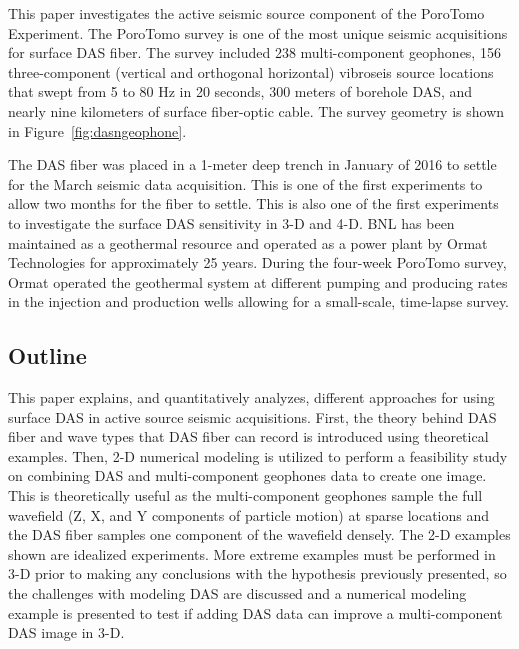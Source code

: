 This paper investigates the active seismic source component of the PoroTomo Experiment. The PoroTomo survey is one of the most unique seismic acquisitions for surface DAS fiber. The survey included 238 multi-component geophones, 156 three-component (vertical and orthogonal horizontal) vibroseis source locations that swept from 5 to 80 Hz in 20 seconds, 300 meters of borehole DAS, and nearly nine kilometers of surface fiber-optic cable. The survey geometry is shown in Figure~\ref{fig:dasngeophone}.


The DAS fiber was placed in a 1-meter deep trench in January of 2016 to settle for the March seismic data acquisition. This is one of the first experiments to allow two months for the fiber to settle. This is also one of the first experiments to investigate the surface DAS sensitivity in 3-D and 4-D. BNL has been maintained as a geothermal resource and operated as a power plant by Ormat Technologies for approximately 25 years. During the four-week PoroTomo survey, Ormat operated the geothermal system at different pumping and producing rates in the injection and production wells allowing for a small-scale, time-lapse survey.

\subsection{Outline}
This paper explains, and quantitatively analyzes, different approaches for using surface DAS in active source seismic acquisitions. First, the theory behind DAS fiber and  wave types that DAS fiber can record is introduced using theoretical examples. Then, 2-D numerical modeling is utilized to perform a feasibility study on combining DAS and multi-component geophones data to create one image. This is theoretically useful as the multi-component geophones sample the full wavefield (Z, X, and Y components of particle motion) at sparse locations and the DAS fiber samples one component of the wavefield densely. The 2-D examples shown are idealized experiments. More extreme examples must be performed in 3-D prior to making any conclusions with the hypothesis previously presented, so the challenges with modeling DAS are discussed and a numerical modeling example is presented to test if adding DAS data can improve a multi-component DAS image in 3-D.






